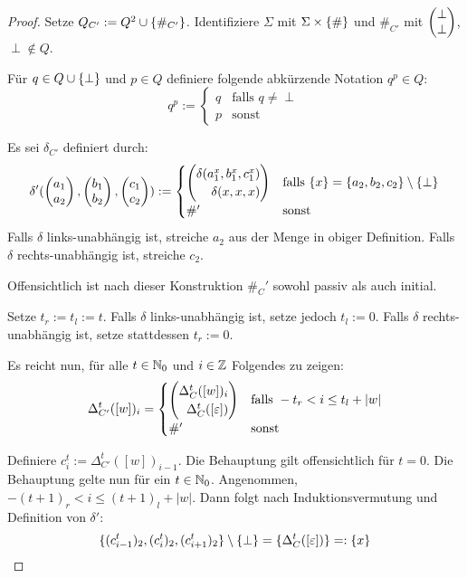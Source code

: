 \begin{proof}
    Setze $Q_{C'} := Q^2 \cup \{ { \#_{C'} } \}$. Identifiziere $\Sigma$ mit $ \Sigma \times \{ {\#} \}$ und $\#_{C'}$ mit $\Spvek{\perp; \perp}$, $\perp \not\in Q$.

    Für $q \in Q \cup \{ {\perp} \}$ und $p \in Q$ definiere folgende abkürzende Notation $q^p \in Q$:
    \[
        q^p := 
        \begin{cases}
            q & \text{falls } q \neq \perp \\
            p & \text{sonst}
        \end{cases}
    \]
    
    Es sei $\delta_{C'}$ definiert durch:
    \[
       \delta'(\Spvek{a_1; a_2}, \Spvek{b_1; b_2}, \Spvek{c_1; c_2}) :=
       \begin{cases}
         \Spvek{  \delta(a_1 ^ {x}, b_1 ^ {x}, c_1 ^ {x}); \delta(x, x, x)  } 
         & \text{falls }
         \finset{x} = \finset{a_2, b_2, c_2} \setminus \finset{ \perp } \\
         \#'
         & \text{sonst}
       \end{cases}
    \]
    Falls $\delta$ links-unabhängig ist, streiche $a_2$ aus der Menge in obiger Definition.
    Falls $\delta$ rechts-unabhängig ist, streiche $c_2$.
    
    Offensichtlich ist nach dieser Konstruktion $\#_C'$ sowohl passiv als auch initial.
    
    Setze $t_r := t_l := t$.
    Falls $\delta$ links-unabhängig ist, setze jedoch $t_l := 0$.
    Falls $\delta$ rechts-unabhängig ist, setze stattdessen $t_r := 0$.
    
    Es reicht nun, für alle $t \in \mathbb{N}_0$ und $i \in \mathbb{Z}$ Folgendes zu zeigen:
    \[
        \Delta_{C'}^t([w])_i = \begin{cases}
            \Spvek{\Delta_C^t([w])_i; \Delta^t_{C}([\varepsilon])} &
                \text{falls } -t_r < i \leq t_l + |w| \\
            \#' & \text{sonst}
        \end{cases}
    \]
    
    Definiere $c^t_i := \Delta_{C'}^t([w])_{i-1}$.
    Die Behauptung gilt offensichtlich für $t = 0$.
    Die Behauptung gelte nun für ein $t \in \mathbb{N}_0$.
    Angenommen, $-(t+1)_r < i \leq (t+1)_l + |w|$.
    Dann folgt nach Induktionsvermutung und Definition von $\delta'$: \[
    \{ { (c^t_{i-1})_2, (c^t_{i})_2, (c^t_{i+1})_2} \} \setminus \{ { \perp } \} = \{ { \Delta^t_{C}([\varepsilon])} \} =: \{ {x} \}
    \]
    

\end{proof}
